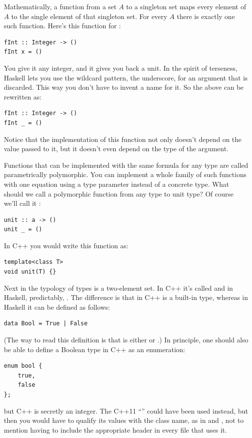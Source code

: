 Mathematically, a function from a set $A$ to a singleton set maps every
element of $A$ to the single element of that singleton set. For every $A$
there is exactly one such function. Here's this function for
:

\begin{Verbatim}
fInt :: Integer -> ()
fInt x = ()
\end{Verbatim}
You give it any integer, and it gives you back a unit. In the spirit of
terseness, Haskell lets you use the wildcard pattern, the underscore,
for an argument that is discarded. This way you don't have to invent a
name for it. So the above can be rewritten as:

\begin{Verbatim}
fInt :: Integer -> ()
fInt _ = ()
\end{Verbatim}
Notice that the implementation of this function not only doesn't depend
on the value passed to it, but it doesn't even depend on the type of the
argument.

Functions that can be implemented with the same formula for any type are
called parametrically polymorphic. You can implement a whole family of
such functions with one equation using a type parameter instead of a
concrete type. What should we call a polymorphic function from any type
to unit type? Of course we'll call it :

\begin{Verbatim}
unit :: a -> ()
unit _ = ()
\end{Verbatim}
In C++ you would write this function as:

\begin{Verbatim}
template<class T>
void unit(T) {}
\end{Verbatim}
Next in the typology of types is a two-element set. In C++ it's called
 and in Haskell, predictably, . The difference
is that in C++  is a built-in type, whereas in Haskell it
can be defined as follows:

\begin{Verbatim}
data Bool = True | False
\end{Verbatim}
(The way to read this definition is that  is either
 or .) In principle, one should also be able
to define a Boolean type in C++ as an enumeration:

\begin{Verbatim}
enum bool { 
    true,
    false
};
\end{Verbatim}
but C++  is secretly an integer. The C++11
``'' could have been used instead, but then you
would have to qualify its values with the class name, as in
 and , not to mention having to
include the appropriate header in every file that uses it.

